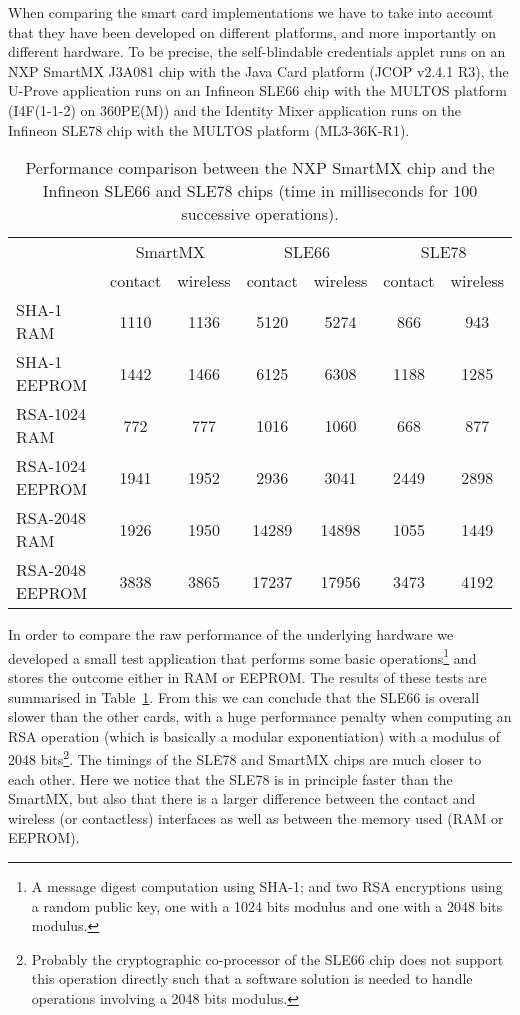 When comparing the smart card implementations we have to take into account that
they have been developed on different platforms, and more importantly on
different hardware. To be precise, the self-blindable credentials applet runs on
an NXP SmartMX J3A081 chip with the Java Card platform (JCOP v2.4.1 R3), the
U-Prove application runs on an Infineon SLE66 chip with the MULTOS platform
(I4F(1-1-2) on 360PE(M)) and the Identity Mixer application runs on the Infineon
SLE78 chip with the MULTOS platform (ML3-36K-R1).

\begin{table}[t]
  \centering
  \caption{Performance comparison between the NXP SmartMX chip and the Infineon
    SLE66 and SLE78 chips (time in milliseconds for 100 successive operations).}
  \label{tab:comparison}
  \renewcommand{\tabcolsep}{1.25mm}
  \renewcommand{\arraystretch}{1.25}
  \begin{tabular}{l|c|c|c|c|c|c|}
     & \multicolumn{2}{c|}{SmartMX} & \multicolumn{2}{c|}{SLE66} & \multicolumn{2}{c|}{SLE78} \\
     & contact & wireless & contact & wireless & contact & wireless \\\hline
    SHA-1 RAM        & 1110 & 1136 &  5120 &  5274 &  866 &  943 \\\hline
    SHA-1 EEPROM     & 1442 & 1466 &  6125 &  6308 & 1188 & 1285 \\\hline
    RSA-1024 RAM     &  772 &  777 &  1016 &  1060 &  668 &  877 \\\hline
    RSA-1024 EEPROM  & 1941 & 1952 &  2936 &  3041 & 2449 & 2898 \\\hline
    RSA-2048 RAM     & 1926 & 1950 & 14289 & 14898 & 1055 & 1449 \\\hline
    RSA-2048 EEPROM  & 3838 & 3865 & 17237 & 17956 & 3473 & 4192 \\\hline
  \end{tabular}
\end{table}

In order to compare the raw performance of the underlying hardware we developed
a small test application that performs some basic operations\footnote{A message
digest computation using SHA-1; and two RSA encryptions using a random public
key, one with a 1024 bits modulus and one with a 2048 bits modulus.} and stores
the outcome either in RAM or EEPROM. The results of these tests are summarised
in Table~\ref{tab:comparison}. From this we can conclude that the SLE66 is
overall slower than the other cards, with a huge performance penalty when
computing an RSA operation (which is basically a modular exponentiation) with a
modulus of 2048 bits\footnote{Probably the cryptographic co-processor of the
SLE66 chip does not support this operation directly such that a software
solution is needed to handle operations involving a 2048 bits modulus.}. The
timings of the SLE78 and SmartMX chips are much closer to each other. Here we
notice that the SLE78 is in principle faster than the SmartMX, but also that
there is a larger difference between the contact and wireless (or contactless)
interfaces as well as between the memory used (RAM or EEPROM).

